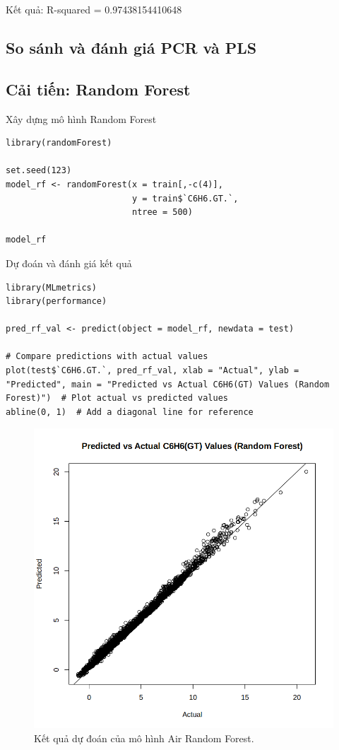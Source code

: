Kết quả: R-squared = 0.97438154410648

\subsection{So sánh và đánh giá PCR và PLS}


\subsection{Cải tiến: Random Forest}

Xây dựng mô hình Random Forest

\begin{lstlisting}
library(randomForest)

set.seed(123)
model_rf <- randomForest(x = train[,-c(4)],
                         y = train$`C6H6.GT.`, 
                         ntree = 500)

model_rf
\end{lstlisting}

Dự đoán và đánh giá kết quả

\begin{lstlisting}
library(MLmetrics)
library(performance)

pred_rf_val <- predict(object = model_rf, newdata = test)

# Compare predictions with actual values
plot(test$`C6H6.GT.`, pred_rf_val, xlab = "Actual", ylab = "Predicted", main = "Predicted vs Actual C6H6(GT) Values (Random Forest)")  # Plot actual vs predicted values
abline(0, 1)  # Add a diagonal line for reference
\end{lstlisting}
\begin{figure}[H]
    \centering
    \includegraphics[width=0.75\columnwidth]{air_figures/air_random_forest.png}
    \caption{Kết quả dự đoán của mô hình Air Random Forest.}
    \label{fig:air_random_forest_prediction}
\end{figure}

